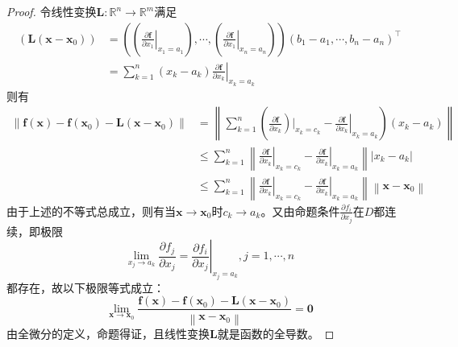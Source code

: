 \documentclass[main.tex]{subfiles}
\begin{document}
\begin{proof}
令线性变换$\mathbf{L}:\mathbb{R}^n\rightarrow \mathbb{R}^m$满足
\begin{align*}
\left(\mathbf{L}\left(\mathbf{x}-\mathbf{x}_0\right)\right)&=\left(\left(\left.\frac{\partial \mathbf{f}}{\partial x_1}\right|_{x_1=a_1}\right),\cdots,\left(\left.\frac{\partial \mathbf{f}}{\partial x_1}\right|_{x_n=a_n}\right)\right)\left(b_1-a_1,\cdots,b_n-a_n\right)^\intercal\\
&=\sum_{k=1}^n\left(x_k-a_k\right)\left.\frac{\partial \mathbf{f}}{\partial x_k}\right|_{x_k=a_k}
\end{align*}
则有
\begin{align*}
    \left\|\mathbf{f}\left(\mathbf{x}\right)-\mathbf{f}\left(\mathbf{x}_0\right)-\mathbf{L}\left(\mathbf{x}-\mathbf{x}_0\right)\right\|&=\left\|\sum_{k=1}^n\left(\left.\frac{\partial \mathbf{f}}{\partial x_k}\right)|_{x_k=c_k}-\left.\frac{\partial \mathbf{f}}{\partial x_k}\right|_{x_k=a_k}\right)\left(x_k-a_k\right)\right\|\\
    &\leq\sum_{k=1}^n\left\|\left.\frac{\partial \mathbf{f}}{\partial x_k}\right|_{x_k=c_k}-\left.\frac{\partial\mathbf{f}}{\partial x_k}\right|_{x_k=a_k}\right\|\left|x_k-a_k\right|\\
    &\leq\sum_{k=1}^n\left\|\left.\frac{\partial\mathbf{f}}{\partial x_k}\right|_{x_k=c_k}-\left.\frac{\partial\mathbf{f}}{\partial x_k}\right|_{x_k=a_k}\right\|\left\|\mathbf{x}-\mathbf{x}_0\right\|
\end{align*}
由于上述的不等式总成立，则有当$\mathbf{x}\to\mathbf{x}_0$时$c_k\to a_k$。又由命题条件$\frac{\partial f_i}{\partial x_j}$在$D$都连续，即极限
\[
\lim_{x_j\to a_k}\frac{\partial f_j}{\partial x_j}=\left.\frac{\partial f_i}{\partial x_j}\right|_{x_j=a_k},j=1,\cdots,n
\]
都存在，故以下极限等式成立：
\[\lim_{\mathbf{x}\to\mathbf{x}_0}\frac{\mathbf{f}\left(\mathbf{x}\right)-\mathbf{f}\left(\mathbf{x}_0\right)-\mathbf{L}\left(\mathbf{x}-\mathbf{x}_0\right)}{\left\|\mathbf{x}-\mathbf{x}_0\right\|}=\mathbf{0}
\]
由全微分的定义，命题得证，且线性变换$\mathbf{L}$就是函数的全导数。
\end{proof}
\end{document}
